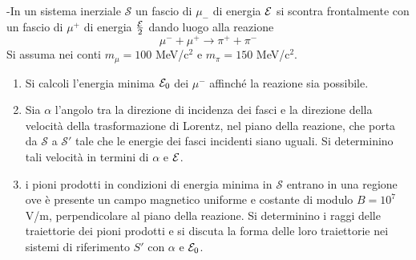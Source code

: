 \documentclass[12pt,twoside,a4]{article}
\begin{document}
\newpage
\begin{esercizio}[Esame 19/02/2015]
	-In un sistema inerziale $\mathcal{S}$ un fascio di $\mu_-$ di energia $\mathcal{E}$ si scontra frontalmente con un fascio di $\mu^+$ di energia $\frac{\mathcal{E}}{2}$ dando luogo alla reazione
$$ \mu^- + \mu^+ \longrightarrow \pi^+ + \pi^- $$
Si assuma nei conti $m_\mu =  100$ MeV/c$^2$ e $m_\pi = 150$ MeV/c$^2$. 
\begin{enumerate}[label=(\textit{\roman*})]
\item Si calcoli l'energia minima $\mathcal{E}_0$ dei $\mu^-$ affinché la reazione sia possibile.
\item Sia $\alpha$ l'angolo tra la direzione di incidenza dei fasci e la direzione della velocità  della trasformazione di Lorentz, nel piano della reazione, che porta da $\mathcal{S}$ a $\mathcal{S}'$ tale che le energie dei fasci incidenti siano uguali. Si determinino tali velocità  in termini di $\alpha$ e $\mathcal{E}$.
\item i pioni prodotti in condizioni di energia minima in $\mathcal{S}$ entrano in una regione ove è presente un campo magnetico uniforme e costante di modulo $B = 10^7$ V/m, perpendicolare al piano della reazione. Si determinino i raggi delle traiettorie dei pioni prodotti e si discuta la forma delle loro traiettorie nei sistemi di riferimento $S'$ con $\alpha$ e $\mathcal{E}_0$. 
\end{enumerate}
\end{esercizio}

\end{document}
